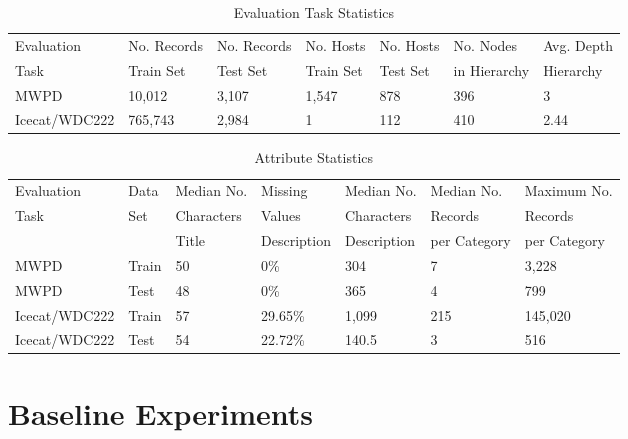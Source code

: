 \documentclass[11pt,dvipdfm]{article}
\begin{document}
\begin{table}[h]
\centering
\begin{tabular}{@{}lllllll@{}}
Evaluation & No. Records & No. Records & No. Hosts & No. Hosts & No. Nodes & Avg. Depth \\
Task & Train Set & Test Set & Train Set & Test Set & in Hierarchy & Hierarchy \\ \hline
MWPD     & 10,012            & 3,107         & 1,547            & 878 & 396                          & 3                      \\
Icecat/WDC222   & 765,743           & 2,984         & 1                & 112 & 410                  & 2.44                \\
\hline
\end{tabular}
\caption{Evaluation Task Statistics}
\label{tab:dataSets}
\end{table}

\begin{table}[h]
\centering
\begin{tabular}{@{}lllllll@{}}
Evaluation & Data & Median No. & Missing  & Median No.  & Median No. & Maximum No.\\ 
Task & Set & Characters & Values & Characters & Records & Records\\
 & & Title & Description & Description & per Category & per Category \\\hline
MWPD     & Train    & 50                           & 0\%                          & 304                                & 7                       & 3,228                    \\
MWPD     & Test     & 48                           & 0\%                        & 365                                & 4                      & 799                   \\ \hline
Icecat/WDC222   & Train    & 57                           & 29.65\%                      & 1,099                              & 215                    & 145,020                     \\
Icecat/WDC222   & Test     & 54                           & 22.72\%                   & 140.5                              & 3                    & 516                     \\ \hline
\end{tabular}
\caption{Attribute Statistics}
\label{tab:attributes}
\end{table}

\section{Baseline Experiments}
\label{sec:base_exp}
\end{document}
